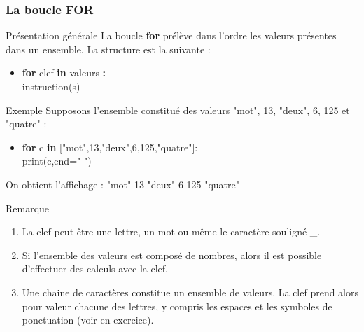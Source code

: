 \documentclass[8pt]{beamer}
\newcounter{num}
\begin{document}
\begin{frame}
\frametitle{La boucle FOR}

\begin{block}{Présentation générale}
La boucle \textbf{for} prélève dans l'ordre les valeurs présentes dans un ensemble.
La structure est la suivante :
\begin{itemize}
\item \textbf{for} clef \textbf{in} valeurs \textbf{:}\\
\hspace{0.5cm} instruction(s)
\end{itemize}
\end{block}

\begin{exampleblock}{Exemple}
Supposons l'ensemble constitué des valeurs "mot", 13, "deux", 6, 125 et "quatre" :
\begin{itemize}
\item \textbf{for} c \textbf{in} ["mot",13,"deux",6,125,"quatre"]:\\
\hspace{0.5cm}print(c,end=" ")
\end{itemize}
On obtient l'affichage : "mot" 13 "deux" 6 125 "quatre"
\end{exampleblock}

\begin{alertblock}{Remarque}
\begin{enumerate}
\item La clef peut être une lettre, un mot ou même le caractère souligné \_.
\item Si l'ensemble des valeurs est composé de nombres, alors il est possible d'effectuer des calculs avec la clef.
\item Une chaine de caractères constitue un ensemble de valeurs. La clef prend alors pour valeur chacune des lettres, y compris les espaces et les symboles de ponctuation (voir en exercice).
\end{enumerate}

\end{alertblock}

\end{frame}
\end{document}
